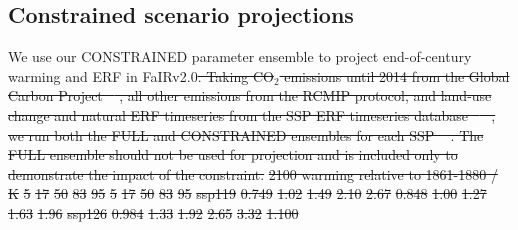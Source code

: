\documentclass[gmd, manuscript]{copernicus}
\providecommand{\DIFdel}[1]{{\protect\color{red}\sout{#1}}}                      %
\providecommand{\DIFdelbegin}{} %
\begin{document}
\subsection{Constrained scenario projections} \label{NROY_ssp}
We use our CONSTRAINED parameter ensemble to project end-of-century warming and ERF in FaIRv2.0\DIFdelbegin \DIFdel{. Taking CO$_2$ emissions until 2014 from the Global Carbon Project \mbox{%
\citep{Friedlingstein2019}}\hspace{0pt}%
, all other emissions from the RCMIP protocol, and land-use change and natural ERF timeseries from the SSP ERF timeseries database \mbox{%
\citep{Smith2020c} }\hspace{0pt}%
, we run both the FULL and CONSTRAINED ensembles for each SSP \mbox{%
\citep{Riahi2017}}\hspace{0pt}%
. The FULL ensemble should not be used for projection and is included only to demonstrate the impact of the constraint.}%
\DIFdel{2100 warming relative to 1861-1880 / K  }%
\DIFdel{5  }%
\DIFdel{17 }%
\DIFdel{50 }%
\DIFdel{83 }%
\DIFdel{95 }%
\DIFdel{5  }%
\DIFdel{17 }%
\DIFdel{50 }%
\DIFdel{83 }%
\DIFdel{95 }%
\DIFdel{ssp119                    }%
\DIFdel{0.749 }%
\DIFdel{1.02 }%
\DIFdel{1.49 }%
\DIFdel{2.10 }%
\DIFdel{2.67 }%
\DIFdel{0.848 }%
\DIFdel{1.00 }%
\DIFdel{1.27 }%
\DIFdel{1.63 }%
\DIFdel{1.96 }%
\DIFdel{ssp126                    }%
\DIFdel{0.984 }%
\DIFdel{1.33 }%
\DIFdel{1.92 }%
\DIFdel{2.65 }%
\DIFdel{3.32 }%
\DIFdel{1.100 }%
\end{document}

